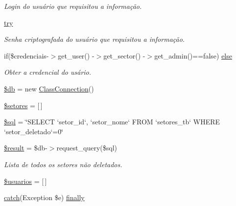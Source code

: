 \begin{DoxyCompactItemize}
\begin{DoxyCompactList}\small\item\em Login do usuário que requisitou a informação. \end{DoxyCompactList}\item 
\hyperlink{menu_2configuracoes_2usuarios_2index_8php_abe4cc9788f52e49485473dc699537388}{try}
\begin{DoxyCompactList}\small\item\em Senha criptografada do usuário que requisitou a informação. \end{DoxyCompactList}\item 
if(\$credenciais-\/$>$get\+\_\+user() -\/$>$get\+\_\+sector() -\/$>$get\+\_\+admin()==false) \hyperlink{menu_2configuracoes_2usuarios_2index_8php_aabe0fce4e8f9f822b09141ab57d918d9}{else}
\begin{DoxyCompactList}\small\item\em Obter a credencial do usário. \end{DoxyCompactList}\item 
\hyperlink{menu_2configuracoes_2usuarios_2index_8php_a1fa3127fc82f96b1436d871ef02be319}{\$db} = new \hyperlink{class_class_connection}{Class\+Connection}()
\item 
\hyperlink{menu_2configuracoes_2usuarios_2index_8php_af62a556436f10f703431108a1a8fc00f}{\$setores} = \mbox{[}$\,$\mbox{]}
\item 
\hyperlink{menu_2configuracoes_2usuarios_2index_8php_a047170d6020a882807665812a27e2525}{\$sql} = \char`\"{}S\+E\+L\+E\+CT `setor\+\_\+id`, `setor\+\_\+nome` F\+R\+OM `setores\+\_\+tb` W\+H\+E\+RE `setor\+\_\+deletado`=0\char`\"{}
\item 
\hyperlink{menu_2configuracoes_2usuarios_2index_8php_a112ef069ddc0454086e3d1e6d8d55d07}{\$result} = \$db-\/$>$request\+\_\+query(\$sql)
\begin{DoxyCompactList}\small\item\em Lista de todos os setores não deletados. \end{DoxyCompactList}\item 
\hyperlink{menu_2configuracoes_2usuarios_2index_8php_afba4f3b049abbbbcf8229ca2095fef33}{\$usuarios} = \mbox{[}$\,$\mbox{]}
\item 
\hyperlink{imprimir_2ficha_2index_8php_a8104793004944f01dd070fc8b1ade3c4}{catch}(Exception \$e) \hyperlink{menu_2configuracoes_2usuarios_2index_8php_a1eb47d68a4a4f73debf91b15e179d813}{finally}
\end{DoxyCompactItemize}


